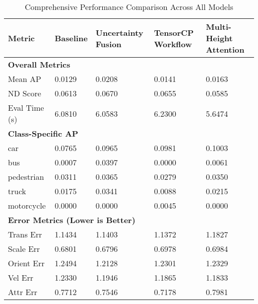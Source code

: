 \begin{table}[ht]
\centering
\caption{Comprehensive Performance Comparison Across All Models}
\label{tab:full_comparison}
\footnotesize
\renewcommand{\arraystretch}{1.2}
\begin{tabularx}{\textwidth}{lXXXX}
\toprule
\rowcolor{gray!30}
\textbf{Metric} & \textbf{Baseline} & \textbf{Uncertainty Fusion} & \textbf{TensorCP Workflow} & \textbf{Multi-Height Attention} \\
\midrule
\multicolumn{5}{l}{\textbf{Overall Metrics}} \\
Mean AP & 0.0129 & 0.0208 & 0.0141 & 0.0163 \\
ND Score & 0.0613 & 0.0670 & 0.0655 & 0.0585 \\
Eval Time (s) & 6.0810 & 6.0583 & 6.2300 & 5.6474 \\
\midrule
\multicolumn{5}{l}{\textbf{Class-Specific AP}} \\
car & 0.0765 & 0.0965 & 0.0981 & 0.1003 \\
bus & 0.0007 & 0.0397 & 0.0000 & 0.0061 \\
pedestrian & 0.0311 & 0.0365 & 0.0279 & 0.0350 \\
truck & 0.0175 & 0.0341 & 0.0088 & 0.0215 \\
motorcycle & 0.0000 & 0.0000 & 0.0045 & 0.0000 \\
\midrule
\multicolumn{5}{l}{\textbf{Error Metrics (Lower is Better)}} \\
Trans Err & 1.1434 & 1.1403 & 1.1372 & 1.1827 \\
Scale Err & 0.6801 & 0.6796 & 0.6978 & 0.6984 \\
Orient Err & 1.2494 & 1.2128 & 1.2301 & 1.2329 \\
Vel Err & 1.2330 & 1.1946 & 1.1865 & 1.1833 \\
Attr Err & 0.7712 & 0.7546 & 0.7178 & 0.7981 \\
\bottomrule
\end{tabularx}
\end{table}